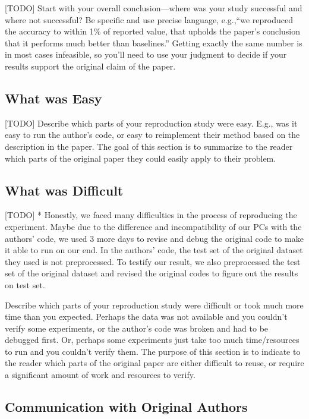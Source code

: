 \documentclass{article}
\begin{document}
[TODO] Start with your overall conclusion---where was your study successful and where not successful? Be specific and use precise language, e.g.,``we reproduced the accuracy to within 1\% of reported value, that upholds the paper's conclusion that it performs much better than baselines.'' Getting exactly the same number is in most cases infeasible, so you'll need to use your judgment to decide if your results support the original claim of the paper. 

\subsection*{What was Easy}

[TODO] Describe which parts of your reproduction study were easy. E.g., was it easy to run the author's code, or easy to reimplement their method based on the description in the paper. The goal of this section is to summarize to the reader which parts of the original paper they could easily apply to their problem. 

\subsection*{What was Difficult}

[TODO] * Honestly, we faced many difficulties in the process of reproducing the experiment. Maybe due to the difference and incompatibility of our PCs with the authors' code, we used 3 more days to revise and debug the original code to make it able to run on our end. In the authors' code, the test set of the original dataset they used is not preprocessed. To testify our result, we also preprocessed the test set of the original dataset and revised the original codes to figure out the results on test set.

Describe which parts of your reproduction study were difficult or took much more time than you expected. Perhaps the data was not available and you couldn't verify some experiments, or the author's code was broken and had to be debugged first. Or, perhaps some experiments just take too much time/resources to run and you couldn't verify them. The purpose of this section is to indicate to the reader which parts of the original paper are either difficult to reuse, or require a significant amount of work and resources to verify. 

\subsection*{Communication with Original Authors}
\end{document}

